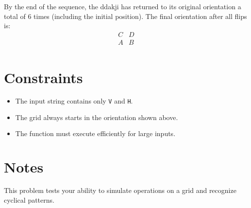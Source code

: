 \documentclass[12pt]{article}
\begin{document}
By the end of the sequence, the ddakji has returned to its original orientation a total of $6$ times (including the initial position). The final orientation after all flips is:
\[
\begin{array}{cc}
C & D \\
A & B \\
\end{array}
\]

\section*{Constraints}
\begin{itemize}
    \item The input string contains only \texttt{V} and \texttt{H}.
    \item The grid always starts in the orientation shown above.
    \item The function must execute efficiently for large inputs.
\end{itemize}

\section*{Notes}
This problem tests your ability to simulate operations on a grid and recognize cyclical patterns.
\end{document}
